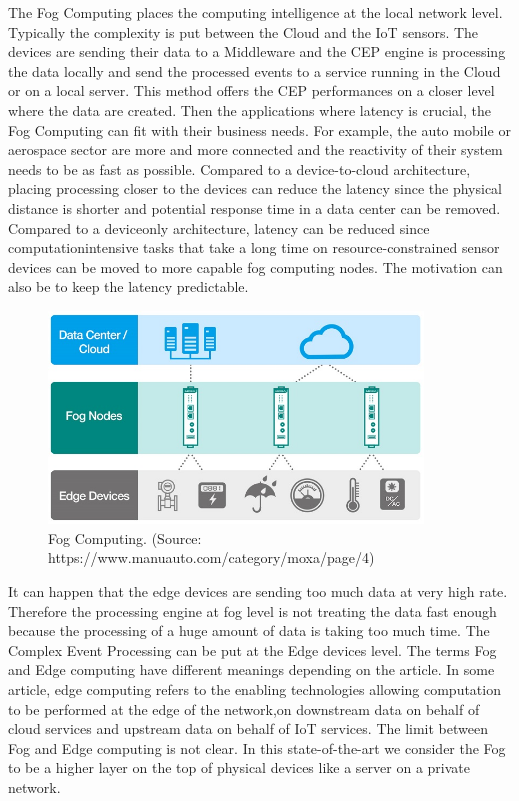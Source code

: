\documentclass[11pt]{article}
\begin{document}
The Fog Computing places the computing intelligence at the local network level. Typically the complexity is put between the Cloud and the IoT sensors. The devices are sending their data to a Middleware and the CEP engine is processing the data locally and send the processed events to a service running in the Cloud or on a local server. This method offers the CEP performances on a closer level where the data are created. Then the applications where latency is crucial, the Fog Computing can fit with their business needs. For example, the auto mobile or aerospace sector are more and more connected and the reactivity of their system needs to be as fast as possible. Compared to a device-to-cloud architecture, placing processing closer to the devices can reduce the latency since the physical distance is shorter and potential response time in a data center can be removed. Compared to a deviceonly architecture, latency can be reduced since computationintensive tasks that take a long time on resource-constrained sensor devices can be moved to more capable fog computing nodes. The motivation can also be to keep the latency predictable.\cite{Towards-power-consumption-delay}

\begin{figure}[H]
	\includegraphics[width=\textwidth,height=160pt]{assets/Fog_Computing.jpg}
	\caption[Fog Computing]{
		Fog Computing. (Source: https://www.manuauto.com/category/moxa/page/4)
	}
	\label{fig:Fog-Computing}
\end{figure}

It can happen that the edge devices are sending too much data at very high rate. Therefore the processing engine at fog level is not treating the data fast enough because the processing of a huge amount of data is taking too much time. The Complex Event Processing can be put at the Edge devices level. The terms Fog and Edge computing have different meanings depending on the article. In some article, edge computing refers to the enabling technologies allowing computation to be performed at the edge of the network,on downstream data on behalf of cloud services and upstream data on behalf of IoT services.\cite{Edge-Computing-Vision-and-Challenges} The limit between Fog and Edge computing is not clear. In this state-of-the-art we consider the Fog to be a higher layer on the top of physical devices like a server on a private network. 
\end{document}
